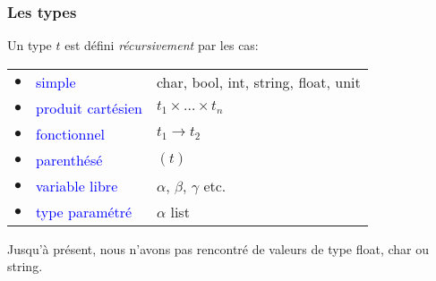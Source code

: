 
%
\begin{frame}
\frametitle{Les types}

Un type $t$ est défini \emph{récursivement} par les cas:

\begin{tabular}{rll}
    $\bullet$
  & \textcolor{blue}{simple}
  & \textsf{char}, \textsf{bool}, \textsf{int}, \textsf{string},
    \textsf{float}, \textsf{unit}\\
    $\bullet$
  & \textcolor{blue}{produit cartésien}
  & $t_1 \times \ldots \times t_n$\\
    $\bullet$
  & \textcolor{blue}{fonctionnel}
  & $t_1 \rightarrow t_2$\\
    $\bullet$
  & \textcolor{blue}{parenthésé}
  & $(t)$\\
    $\bullet$
  & \textcolor{blue}{variable libre}
  & $\alpha$, $\beta$, $\gamma$ etc. \\
    $\bullet$
  & \textcolor{blue}{type paramétré}
  & $\alpha$ \textsf{list}
\end{tabular}

\bigskip

\remarque 

Jusqu'à présent, nous n'avons pas rencontré de valeurs de type
\textsf{float}, \textsf{char} ou \textsf{string}.

\end{frame}


